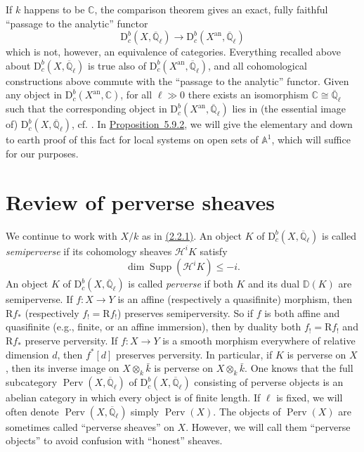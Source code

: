 If \(k\) happens to be \(\mathbb{C}\), the comparison theorem gives an exact,
fully faithful ``passage to the analytic'' functor
\[
  \mathrm{D}^b_c(X,\overline{\mathbb{Q}}_\ell)\to
  \mathrm{D}^b_c(X^{\mathrm{an}},\overline{\mathbb{Q}}_\ell)
\]
which is not, however, an equivalence of categories. Everything recalled above
about \(\mathrm{D}^b_c(X,\overline{\mathbb{Q}}_\ell)\) is true also of
\(\mathrm{D}^b_c(X^{\mathrm{an}},\overline{\mathbb{Q}}_\ell)\), and all
cohomological constructions above commute with the ``passage to the analytic''
functor. Given any object in
\(\mathrm{D}^b_c(X^{\mathrm{an}},\mathbb{C})\), for all \(\ell\gg 0\) there
exists an isomorphism
\(\mathbb{C}\cong\overline{\mathbb{Q}}_\ell\) such that the corresponding
object in
\(\mathrm{D}^b_c(X^{\mathrm{an}},\overline{\mathbb{Q}}_\ell)\) lies in (the
essential image of)
\(\mathrm{D}^b_c(X,\overline{\mathbb{Q}}_\ell)\), cf. \cite[6.1]{BBD}. In
\hyperref[prop:5.9.2]{Proposition~5.9.2}, we will give the elementary and down to earth proof
of this fact for local systems on open sets of \(\mathbb{A}^1\), which will
suffice for our purposes.

\section{Review of perverse sheaves}
\label{sec:2.3}

We continue to work with \(X/k\) as in \hyperref[par:2.2.1]{(2.2.1)}. An object \(K\) of
\(\mathrm{D}^b_c(X,\overline{\mathbb{Q}}_\ell)\) is called
\emph{semiperverse} if its cohomology sheaves \(\mathcal{H}^iK\) satisfy
\[
  \dim\operatorname{Supp}(\mathcal{H}^iK)\leq -i.
\]
An object \(K\) of \(\mathrm{D}^b_c(X,\overline{\mathbb{Q}}_\ell)\) is called
\emph{perverse} if both \(K\) and its dual \(\mathbb{D}(K)\) are semiperverse.
If \(f:X\to Y\) is an affine (respectively a quasifinite) morphism, then
\(\mathrm{R}f_*\) (respectively \(f_!=\mathrm{R}f_!\)) preserves
semiperversity. So if \(f\) is
both affine and quasifinite (e.g., finite, or an affine immersion), then by
duality both \(f_!=\mathrm{R}f_!\) and \(\mathrm{R}f_*\) preserve perversity.
If \(f:X\to Y\) is
a smooth morphism everywhere of relative dimension \(d\), then \(f^*[d]\)
preserves perversity. In particular, if \(K\) is perverse on \(X\), then its
inverse image on \(X\otimes_k\bar{k}\) is perverse on \(X\otimes_k\bar{k}\).
One knows that the full subcategory
\(\operatorname{Perv}(X,\overline{\mathbb{Q}}_\ell)\) of
\(\mathrm{D}^b_c(X,\overline{\mathbb{Q}}_\ell)\) consisting of perverse
objects is an abelian category in which every object is of finite length. If
\(\ell\) is fixed, we will often denote
\(\operatorname{Perv}(X,\overline{\mathbb{Q}}_\ell)\) simply
\(\operatorname{Perv}(X)\). The objects of \(\operatorname{Perv}(X)\) are
sometimes called ``perverse sheaves'' on \(X\). However, we will call them
``perverse objects'' to avoid confusion with ``honest'' sheaves.

